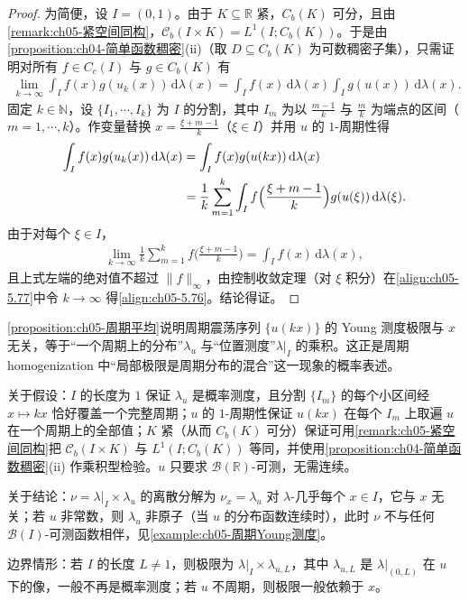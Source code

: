 \documentclass[../../main.tex]{subfiles}%
\begin{document}
\begin{proof}
为简便，设 $I=(0,1)$。由于 $K\subseteq\mathbb{R}$ 紧，$C_b(K)$ 可分，且由\cref{remark:ch05-紧空间同构}，$\mathcal{C}_b(I\times K)=L^1(I;C_b(K))$。于是由\cref{proposition:ch04-简单函数稠密}(ii)（取 $D\subseteq C_b(K)$ 为可数稠密子集），只需证明对所有 $f\in C_c(I)$ 与 $g\in C_b(K)$ 有
\begin{align}
\lim_{k\to\infty}\int_If(x)g(u_k(x))\,\mathrm{d}\lambda(x)
=\int_If(x)\,\mathrm{d}\lambda(x)\int_Ig(u(x))\,\mathrm{d}\lambda(x).\label{align:ch05-5.76}
\end{align}
固定 $k\in\mathbb{N}$，设 $\{I_1,\cdots,I_k\}$ 为 $I$ 的分割，其中 $I_m$ 为以 $\frac{m-1}{k}$ 与 $\frac mk$ 为端点的区间（$m=1,\cdots,k$）。作变量替换 $x=\frac{\xi+m-1}{k}$（$\xi\in I$）并用 $u$ 的 $1$-周期性得
\begin{align}
\int_If(x)g(u_k(x))\,\mathrm{d}\lambda(x)
&=\int_If(x)g(u(kx))\,\mathrm{d}\lambda(x)\notag\\
&=\frac1k\sum_{m=1}^k\int_If\Big(\frac{\xi+m-1}{k}\Big)g(u(\xi))\,\mathrm{d}\lambda(\xi).\label{align:ch05-5.77}
\end{align}
由于对每个 $\xi\in I$，
\begin{align*}
\lim_{k\to\infty}\frac1k\sum_{m=1}^kf\Big(\frac{\xi+m-1}{k}\Big)=\int_If(x)\,\mathrm{d}\lambda(x),
\end{align*}
且上式左端的绝对值不超过 $\|f\|_\infty$，由控制收敛定理（对 $\xi$ 积分）在\eqref{align:ch05-5.77}中令 $k\to\infty$ 得\eqref{align:ch05-5.76}。结论得证。
\end{proof}

\begin{remark}\label{remark:ch05-周期}
\cref{proposition:ch05-周期平均}说明周期震荡序列 $\{u(kx)\}$ 的 Young 测度极限与 $x$ 无关，等于“一个周期上的分布”$\lambda_u$ 与“位置测度”$\lambda|_I$ 的乘积。这正是周期 homogenization 中“局部极限是周期分布的混合”这一现象的概率表述。

关于假设：$I$ 的长度为 $1$ 保证 $\lambda_u$ 是概率测度，且分割 $\{I_m\}$ 的每个小区间经 $x\mapsto kx$ 恰好覆盖一个完整周期；$u$ 的 $1$-周期性保证 $u(kx)$ 在每个 $I_m$ 上取遍 $u$ 在一个周期上的全部值；$K$ 紧（从而 $C_b(K)$ 可分）保证可用\cref{remark:ch05-紧空间同构}把 $\mathcal{C}_b(I\times K)$ 与 $L^1(I;C_b(K))$ 等同，并使用\cref{proposition:ch04-简单函数稠密}(ii) 作乘积型检验。$u$ 只要求 $\mathscr{B}(\mathbb{R})$-可测，无需连续。

关于结论：$\nu=\lambda|_I\times\lambda_u$ 的离散分解为 $\nu_x=\lambda_u$ 对 $\lambda$-几乎每个 $x\in I$，它与 $x$ 无关；若 $u$ 非常数，则 $\lambda_u$ 非原子（当 $u$ 的分布函数连续时），此时 $\nu$ 不与任何 $\mathscr{B}(I)$-可测函数相伴，见\cref{example:ch05-周期Young测度}。

边界情形：若 $I$ 的长度 $L\neq1$，则极限为 $\lambda|_I\times\lambda_{u,L}$，其中 $\lambda_{u,L}$ 是 $\lambda|_{(0,L)}$ 在 $u$ 下的像，一般不再是概率测度；若 $u$ 不周期，则极限一般依赖于 $x$。
\end{remark}
\end{document}
